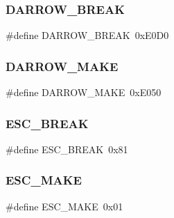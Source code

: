 \hypertarget{group__scancodes_ga02742462a869b87ad2a34d8bc6a3fe58}{}\label{group__scancodes_ga02742462a869b87ad2a34d8bc6a3fe58} 
\subsubsection{\texorpdfstring{D\+A\+R\+R\+O\+W\+\_\+\+B\+R\+E\+AK}{DARROW\_BREAK}}
{\footnotesize\ttfamily \#define D\+A\+R\+R\+O\+W\+\_\+\+B\+R\+E\+AK~0x\+E0\+D0}

\hypertarget{group__scancodes_ga5e0594973062eb7d381ee43ff19a0369}{}\label{group__scancodes_ga5e0594973062eb7d381ee43ff19a0369} 
\subsubsection{\texorpdfstring{D\+A\+R\+R\+O\+W\+\_\+\+M\+A\+KE}{DARROW\_MAKE}}
{\footnotesize\ttfamily \#define D\+A\+R\+R\+O\+W\+\_\+\+M\+A\+KE~0x\+E050}

\hypertarget{group__scancodes_ga343f44cb034d2d2ff3438b3d45dcde1f}{}\label{group__scancodes_ga343f44cb034d2d2ff3438b3d45dcde1f} 
\subsubsection{\texorpdfstring{E\+S\+C\+\_\+\+B\+R\+E\+AK}{ESC\_BREAK}}
{\footnotesize\ttfamily \#define E\+S\+C\+\_\+\+B\+R\+E\+AK~0x81}

\hypertarget{group__scancodes_ga168fd0a54619731c76c386a7f1bde2b1}{}\label{group__scancodes_ga168fd0a54619731c76c386a7f1bde2b1} 
\subsubsection{\texorpdfstring{E\+S\+C\+\_\+\+M\+A\+KE}{ESC\_MAKE}}
{\footnotesize\ttfamily \#define E\+S\+C\+\_\+\+M\+A\+KE~0x01}

